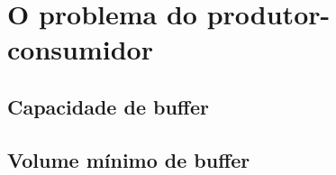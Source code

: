 \chapter{O problema do produtor-consumidor}

\section{Capacidade de buffer}

\section{Volume mínimo de buffer}
